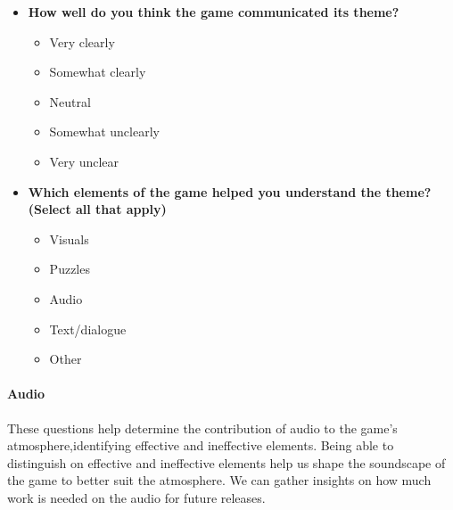 \documentclass[
  letterpaper,
  DIV=11,
  numbers=noendperiod]{scrartcl}
\let\oldparagraph\paragraph
\renewcommand{\paragraph}[1]{\oldparagraph{#1}\mbox{}}
\providecommand{\tightlist}{%
  \setlength{\itemsep}{0pt}\setlength{\parskip}{0pt}}\usepackage{longtable,booktabs,array}
\begin{document}
\begin{itemize}
\item
  \textbf{How well do you think the game communicated its theme?}

  \begin{itemize}
  \tightlist
  \item
    Very clearly
  \item
    Somewhat clearly
  \item
    Neutral
  \item
    Somewhat unclearly
  \item
    Very unclear
  \end{itemize}
\item
  \textbf{Which elements of the game helped you understand the theme?
  (Select all that apply)}

  \begin{itemize}
  \tightlist
  \item
    Visuals
  \item
    Puzzles
  \item
    Audio
  \item
    Text/dialogue
  \item
    Other
  \end{itemize}
\end{itemize}

\paragraph{Audio}\label{audio}

These questions help determine the contribution of audio to the game's
atmosphere,identifying effective and ineffective elements. Being able to
distinguish on effective and ineffective elements help us shape the
soundscape of the game to better suit the atmosphere. We can gather
insights on how much work is needed on the audio for future releases.
\end{document}
